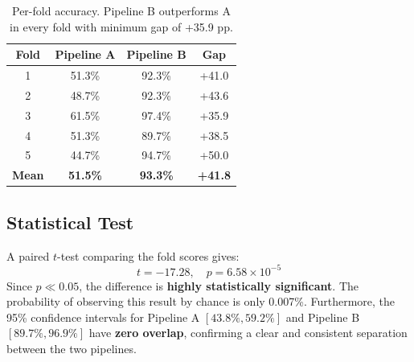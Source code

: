 \begin{table}[h]
\centering
\renewcommand{\arraystretch}{1.3}
\begin{tabular}{|c|c|c|c|}
\hline
\textbf{Fold} & \textbf{Pipeline A} & \textbf{Pipeline B} & \textbf{Gap} \\
\hline
1 & 51.3\% & 92.3\% & +41.0 \\
2 & 48.7\% & 92.3\% & +43.6 \\
3 & 61.5\% & 97.4\% & +35.9 \\
4 & 51.3\% & 89.7\% & +38.5 \\
5 & 44.7\% & 94.7\% & +50.0 \\
\hline
\textbf{Mean} & \textbf{51.5\%} & \textbf{93.3\%} & \textbf{+41.8} \\
\hline
\end{tabular}
\caption{Per-fold accuracy. Pipeline B outperforms A in every fold with minimum gap of +35.9 pp.}
\end{table}

\subsection{Statistical Test}
A paired $t$-test comparing the fold scores gives:
$$t = -17.28, \quad p = 6.58 \times 10^{-5}$$
Since $p \ll 0.05$, the difference is \textbf{highly statistically significant}. The probability of observing this result by chance is only 0.007\%. Furthermore, the 95\% confidence intervals for Pipeline A $[43.8\%, 59.2\%]$ and Pipeline B $[89.7\%, 96.9\%]$ have \textbf{zero overlap}, confirming a clear and consistent separation between the two pipelines.
